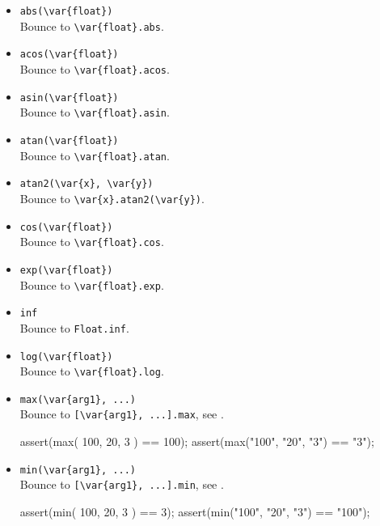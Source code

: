 \begin{itemize}
\item \lstinline|abs(\var{float})|\\
  Bounce to \lstinline|\var{float}.abs|.

\item \lstinline|acos(\var{float})|\\
  Bounce to \lstinline|\var{float}.acos|.

\item \lstinline|asin(\var{float})|\\
  Bounce to \lstinline|\var{float}.asin|.

\item \lstinline|atan(\var{float})|\\
  Bounce to \lstinline|\var{float}.atan|.

\item \lstinline|atan2(\var{x}, \var{y})|\\
  Bounce to \lstinline|\var{x}.atan2(\var{y})|.

\item \lstinline|cos(\var{float})|\\
  Bounce to \lstinline|\var{float}.cos|.

\item \lstinline|exp(\var{float})|\\
  Bounce to \lstinline|\var{float}.exp|.

\item \lstinline|inf|\\
  Bounce to \lstinline|Float.inf|.

\item \lstinline|log(\var{float})|\\
  Bounce to \lstinline|\var{float}.log|.

\item \lstinline|max(\var{arg1}, ...)|\\
  Bounce to \lstinline|[\var{arg1}, ...].max|, see .
\begin{urbiscript}
assert(max( 100,   20,   3 ) == 100);
assert(max("100", "20", "3") == "3");
\end{urbiscript}

\item \lstinline|min(\var{arg1}, ...)|\\
  Bounce to \lstinline|[\var{arg1}, ...].min|, see .
\begin{urbiscript}[firstnumber=last]
assert(min( 100,   20,   3 ) ==     3);
assert(min("100", "20", "3") == "100");
\end{urbiscript}


\end{itemize}
